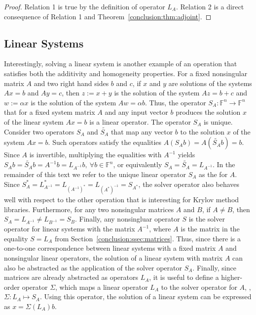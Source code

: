 \begin{proof}
Relation 1 is true by the definition of operator $L_A$. Relation 2 is a direct
consequence of Relation 1 and Theorem~\ref{conclusion:thm:adjoint}.
\end{proof}

\subsection{Linear Systems}
\label{conclusion:ssec:systems}

Interestingly, solving a linear system is another example of an operation
that satisfies both the additivity and homogeneity properties. For a fixed
nonsingular matrix $A$ and two right hand sides $b$ and $c$, if $x$
and $y$ are solutions of the systems $Ax = b$ and $Ay = c$, then $z := x + y$ is
the solution of the system $Az = b + c$ and $w := \alpha x$ is the solution of
the system $Aw = \alpha b$. Thus, the operator $S_A : \mathbb{F}^n \rightarrow
\mathbb{F}^n$ that for a fixed system matrix $A$ and any input vector $b$
produces the solution $x$ of the linear system $Ax = b$ is a linear operator.
The operator $S_A$ is unique. Consider two operators $S_A$ and $\widetilde{S_A}$
that map any vector $b$ to the solution $x$ of the system $Ax = b$.
Such operators satisfy the equalities $A(S_Ab) = A(\widetilde{S_A}b) = b$. Since
$A$ is invertible, multiplying the equalities with $A^{-1}$ yields $S_Ab =
\widetilde{S_A}b = A^{-1}b = L_{A^{-1}}b, \ \forall b \in \mathbb{F}^n$, or
equivalently $S_A = \widetilde{S_A} = L_{A^{-1}}$. In the remainder of this
text we refer to the unique linear operator $S_A$ as the  for $A$. Since $S_A^* = L_{A^{-1}}^* = L_{(A^{-1})^*} = L_{(A^*)^{-1}}
= S_{A^*}$, the solver operator also behaves well with respect to the other
operation that is interesting for Krylov method libraries. Furthermore, for any
two nonsingular matrices $A$ and $B$, if $A \neq B$, then $S_A = L_{A^{-1}} \neq
L_{B^{-1}} = S_B$. Finally, any nonsingluar operator $S$ is the solver operator
for linear systems with the matrix $A^{-1}$, where $A$ is the matrix in the
equality $S = L_A$ from Section~\ref{conclusion:ssec:matrices}.
Thus, since there is a one-to-one correspondence between linear systems with a
fixed matrix $A$ and nonsingular linear operators, the solution of a linear
system with matrix $A$ can also be abstracted as the application of the solver
operator $S_A$. Finally, since matrices are already abstracted as operators
$L_A$, it is useful to define a higher-order operator $\Sigma$, which maps a
linear operator $L_A$ to the solver operator for $A$, \ie, $\Sigma : L_A \mapsto
S_A$. Using this operator, the solution of a linear system can be expressed as
$x = \Sigma(L_A)b$.

